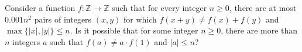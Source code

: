 Consider a function $f: \mathbb Z \to \mathbb Z$ such that for every integer $n \ge 0$, there are at most $0.001n^2$ pairs of integers $(x,y)$ for which $f(x+y) \neq f(x)+f(y)$ and $\max\{ \lvert x \rvert, \lvert y \rvert \} \le n$.  Is it possible that for some integer $n \ge 0$, there are more than $n$ integers $a$ such that $f(a) \neq a \cdot f(1)$ and $\lvert a \rvert \le n$?

